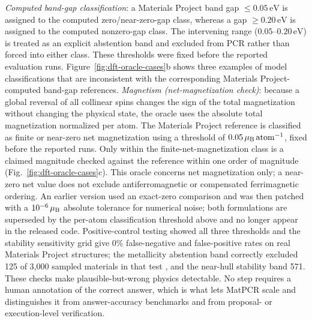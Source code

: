 \documentclass[pdflatex,sn-nature]{sn-jnl}
\newcommand{\rev}[1]{#1} %
\newcommand{\rev}[1]{{\color{blue}#1}} %
\providecommand{\DIFadd}[1]{{\protect\color{blue} \sf #1}} %
\providecommand{\DIFdel}[1]{{\protect\color{red} \scriptsize #1}} %
\providecommand{\DIFaddbegin}{} %
\providecommand{\DIFaddend}{} %
\providecommand{\DIFdelbegin}{} %
\providecommand{\DIFdelend}{} %
\providecommand{\DIFscaledelfig}{0.5}
\newlength{\DIFdelgraphicswidth} %
\newlength{\DIFdelgraphicsheight} %
\providecommand{\DIFaddincludegraphics}[2][]{{\color{blue}\fbox{\DIFOincludegraphics[#1]{#2}}}} %
\providecommand{\DIFdelincludegraphics}[2][]{%
\sbox{\DIFdelgraphicsbox}{\DIFOincludegraphics[#1]{#2}}%
\settoboxwidth{\DIFdelgraphicswidth}{\DIFdelgraphicsbox} %
\settoboxtotalheight{\DIFdelgraphicsheight}{\DIFdelgraphicsbox} %
\scalebox{\DIFscaledelfig}{%
\parbox[b]{\DIFdelgraphicswidth}{\usebox{\DIFdelgraphicsbox}\\[-\baselineskip] \rule{\DIFdelgraphicswidth}{0em}}\llap{\resizebox{\DIFdelgraphicswidth}{\DIFdelgraphicsheight}{%
\setlength{\unitlength}{\DIFdelgraphicswidth}%
\begin{picture}(1,1)%
\thicklines\linethickness{2pt} %
{\color[rgb]{1,0,0}\put(0,0){\framebox(1,1){}}}%
{\color[rgb]{1,0,0}\put(0,0){\line( 1,1){1}}}%
{\color[rgb]{1,0,0}\put(0,1){\line(1,-1){1}}}%
\end{picture}%
}\hspace*{3pt}}} %
} %
\DeclareRobustCommand{\DIFaddbegin}{\DIFOaddbegin \let\includegraphics\DIFaddincludegraphics} %
\DeclareRobustCommand{\DIFaddend}{\DIFOaddend \let\includegraphics\DIFOincludegraphics} %
\DeclareRobustCommand{\DIFdelbegin}{\DIFOdelbegin \let\includegraphics\DIFdelincludegraphics} %
\DeclareRobustCommand{\DIFdelend}{\DIFOaddend \let\includegraphics\DIFOincludegraphics} %
\begin{document}
\emph{Computed band-gap classification}: a Materials Project band gap
$\leq0.05\,\mathrm{eV}$ is assigned to the computed zero/near-zero-gap
class, whereas a gap $\geq0.20\,\mathrm{eV}$ is assigned to the computed
nonzero-gap class. The intervening range
($0.05$--$0.20\,\mathrm{eV}$) is treated as an explicit abstention band
and excluded from PCR rather than forced into either class. These thresholds
were fixed before the reported evaluation runs. Figure~\ref{fig:dft-oracle-cases}b
shows three examples of model classifications that are inconsistent with the
corresponding Materials Project-computed band-gap references.
\emph{Magnetism (net-magnetization check)}: because a global reversal of all
collinear spins changes the sign of the total magnetization without changing the
physical state, the oracle uses the absolute total magnetization normalized per
atom. The Materials Project reference is classified as finite or near-zero net
magnetization using a threshold of
$0.05\,\mu_{\rm B}\,\mathrm{atom}^{-1}$, fixed before the reported runs.
Only within the finite-net-magnetization class is a claimed magnitude checked
against the reference within one order of magnitude
(Fig.~\ref{fig:dft-oracle-cases}c). This oracle concerns net magnetization only;
a near-zero net value does not exclude antiferromagnetic or compensated
ferrimagnetic ordering.
\DIFdelbegin \DIFdel{An earlier version used an exact-zero comparison and was
then patched with a $10^{-6}\,\mu_{\rm B}$ absolute tolerance for numerical noise;
both formulations are superseded by the per-atom classification threshold above
and no longer appear in the released code.
}\DIFdelend Positive-control testing showed all
three thresholds and the stability sensitivity grid give 0\% false-negative and
false-positive rates on real Materials Project structures; the metallicity abstention band
correctly excluded 125 of 3{,}000 sampled materials in that test\DIFaddbegin \DIFadd{\rev{, and the near-hull stability band 571}}\DIFaddend . These checks make plausible-but-wrong physics detectable.
No step requires a human annotation of the correct answer, which is what lets MatPCR
scale and distinguishes it from answer-accuracy benchmarks and from proposal- or
execution-level verification.
\end{document}
